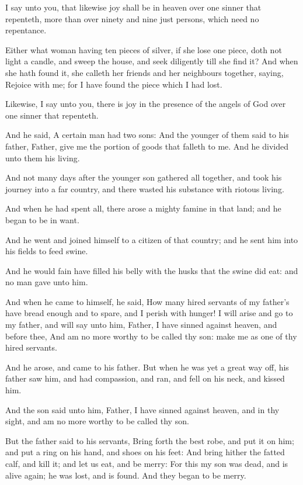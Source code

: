 \Verse I say unto you, that likewise joy shall be in heaven over one sinner that repenteth, more than over ninety and nine just persons, which need no repentance.

\Verse Either what woman having ten pieces of silver, if she lose one piece, doth not light a candle, and sweep the house, and seek diligently till she find it?  \Verse And when she hath found it, she calleth her friends and her neighbours together, saying, Rejoice with me; for I have found the piece which I had lost.

\Verse Likewise, I say unto you, there is joy in the presence of the angels of God over one sinner that repenteth.

\Verse And he said, A certain man had two sons: \Verse And the younger of them said to his father, Father, give me the portion of goods that falleth to me. And he divided unto them his living.

\Verse And not many days after the younger son gathered all together, and took his journey into a far country, and there wasted his substance with riotous living.

\Verse And when he had spent all, there arose a mighty famine in that land; and he began to be in want.

\Verse And he went and joined himself to a citizen of that country; and he sent him into his fields to feed swine.

\Verse And he would fain have filled his belly with the husks that the swine did eat: and no man gave unto him.

\Verse And when he came to himself, he said, How many hired servants of my father's have bread enough and to spare, and I perish with hunger!  \Verse I will arise and go to my father, and will say unto him, Father, I have sinned against heaven, and before thee, \Verse And am no more worthy to be called thy son: make me as one of thy hired servants.

\Verse And he arose, and came to his father. But when he was yet a great way off, his father saw him, and had compassion, and ran, and fell on his neck, and kissed him.

\Verse And the son said unto him, Father, I have sinned against heaven, and in thy sight, and am no more worthy to be called thy son.

\Verse But the father said to his servants, Bring forth the best robe, and put it on him; and put a ring on his hand, and shoes on his feet: \Verse And bring hither the fatted calf, and kill it; and let us eat, and be merry: \Verse For this my son was dead, and is alive again; he was lost, and is found. And they began to be merry.

